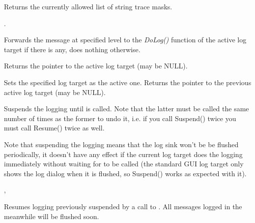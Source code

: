 Returns the currently allowed list of string trace masks.

.

\label{wxlogonlog}


Forwards the message at specified level to the {\it DoLog()} function of the
active log target if there is any, does nothing otherwise.

\label{wxloggetactivetarget}


Returns the pointer to the active log target (may be NULL).

\label{wxlogsetactivetarget}


Sets the specified log target as the active one. Returns the pointer to the
previous active log target (may be NULL).

\label{wxlogsuspend}


Suspends the logging until  is called. Note that
the latter must be called the same number of times as the former to undo it,
i.e. if you call Suspend() twice you must call Resume() twice as well.

Note that suspending the logging means that the log sink won't be be flushed
periodically, it doesn't have any effect if the current log target does the
logging immediately without waiting for  to be
called (the standard GUI log target only shows the log dialog when it is
flushed, so Suspend() works as expected with it).


,\\

\label{wxlogresume}


Resumes logging previously suspended by a call to
. All messages logged in the meanwhile will be
flushed soon.

